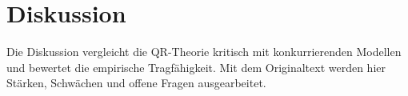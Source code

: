 \section{Diskussion}
Die Diskussion vergleicht die QR-Theorie kritisch mit konkurrierenden Modellen
und bewertet die empirische Tragf\"ahigkeit. Mit dem Originaltext werden hier
St\"arken, Schw\"achen und offene Fragen ausgearbeitet.
